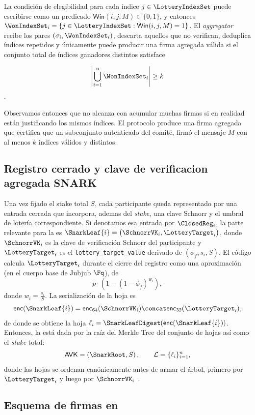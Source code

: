 La condición de elegibilidad para cada índice $j \in \LotteryIndexSet$ puede escribirse como un predicado $\mathsf{Win}(i,j,M) \in \{0,1\}$, y entonces $\WonIndexSet_i = \{j \in \LotteryIndexSet: \mathsf{Win}(i, j, M) = 1 \}$. El \textit{aggregator} recibe los pares $(\sigma_i, \WonIndexSet_i)$, descarta aquellos que no verifican, deduplica índices repetidos y únicamente puede producir una firma agregada válida si el conjunto total de índices ganadores distintos satisface

$$\left| \bigcup_{i=1}^{n} \WonIndexSet_i \right| \geq k$$.

Observamos entonces que no alcanza con acumular muchas firmas si en realidad están justificando los mismos índices. El protocolo \STM produce una firma agregada que certifica que un subconjunto autenticado del comité, firmó el mensaje $M$ con al menos $k$ índices válidos y distintos.

\subsection{Registro cerrado y clave de verificacion agregada SNARK}

Una vez fijado el stake total $S$, cada participante queda representado por una entrada cerrada que incorpora, ademas del \textit{stake}, una clave Schnorr y el umbral de lotería correspondiente. Si denotamos esa entrada por $\ClosedReg_i$, la parte relevante para la \AVK es $\SnarkLeaf{i} = \bigl(\SchnorrVK_i,\LotteryTarget_i\bigr)$,
donde $\SchnorrVK_i$ es la clave de verificación Schnorr del participante y $\LotteryTarget_i$ es el \texttt{lottery\_target\_value} derivado de $(\phi_f,s_i,S)$. El código calcula $\LotteryTarget_i$ durante el cierre del registro como una aproximación (en el cuerpo base de Jubjub $\Fq$), de
$$p \cdot \left(1-(1-\phi_f)^{w_i}\right),$$
donde $w_i = \frac{s_i}{S}$. La serialización de la hoja es
$$\mathsf{enc}(\SnarkLeaf{i}) = \mathsf{enc}_{64}(\SchnorrVK_i) \concat \mathsf{enc}_{32}(\LotteryTarget_i),$$
de donde se obtiene la hoja $\ell_i = \SnarkLeafDigest(\mathsf{enc}(\SnarkLeaf{i}))$. Entonces, la \AVK está dada por la raíz del Merkle Tree del conjunto de hojas así como el \textit{stake} total:
$$\mathsf{AVK} = \left(\SnarkRoot, S \right), \qquad \mathcal{L} = \{\ell_i\}_{i=1}^{n},$$
donde las hojas se ordenan canónicamente antes de armar el árbol, primero por $\LotteryTarget_i$ y luego por $\SchnorrVK_i$ \cite{MithrilSTMRepo}.

\subsection{Esquema de firmas en \Lagrange}

